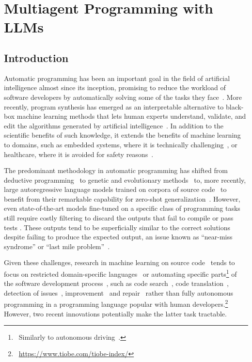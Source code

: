 \chapter{Multiagent Programming with LLMs}
\label{ch:seidr}


\section{Introduction}
\label{sec:intro}

Automatic programming has been an important goal in the field of artificial intelligence almost since its inception, promising to reduce the workload of software developers by automatically solving some of the tasks they face~\cite{manna1971:automatic}.
More recently, program synthesis has emerged as an interpretable alternative to black-box machine learning methods that lets human experts understand, validate, and edit the algorithms generated by artificial intelligence~\cite{bastani2022:interpretable}.
In addition to the scientific benefits of such knowledge, it extends the benefits of machine learning to domains, such as embedded systems, where it is technically challenging~\cite{dhar2021:survey}, or healthcare, where it is avoided for safety reasons~\cite{connolly2023:systematic,jia2022:role}.

The predominant methodology in automatic programming has shifted from deductive programming~\cite{manna1992:fundamentals,alur2015:syntaxguided} to genetic and evolutionary methods~\cite{ahvanooey2019:survey} to, more recently, large autoregressive language models trained on corpora of source code~\cite{xu2022:systematic, zan2023:large} to benefit from their remarkable capability for zero-shot generalization~\cite{chen2021:evaluating}.
However, even state-of-the-art models fine-tuned on a specific class of programming tasks still require costly filtering to discard the outputs that fail to compile or pass tests \cite{li2022:competitionlevel}.
These outputs tend to be superficially similar to the correct solutions~\cite{ren2020:codebleu,liu2023:your, shirafuji2023:exploring} despite failing to produce the expected output, an issue known as ``near-miss syndrome'' or ``last mile problem''~\cite{bavishi2022:neurosymbolic}. 

Given these challenges, research in machine learning on source code~\cite{allamanis2018:survey} tends to focus on restricted domain-specific languages~\cite{chen2021:latent,polozov2015:flashmeta,liventsev2021:bf} or automating specific parts\footnote{~Similarly to autonomous driving~\cite{grigorescu2020:survey,marcano2020:review}.} of the software development process~\cite{lu2021:codexglue,niu2023:crosscodebench}, such as code search~\cite{di2023code, kim2023big}, code translation~\cite{yan2023codetransocean}, detection of issues~\cite{fernandes2016:reviewbased,chakraborty2021:deep}, improvement~\cite{petke2018:genetic} and repair~\cite{legoues2019:automated} rather than fully autonomous programming in a programming language popular with human developers.\footnote{~\url{https://www.tiobe.com/tiobe-index/}}
However, two recent innovations potentially make the latter task tractable.

